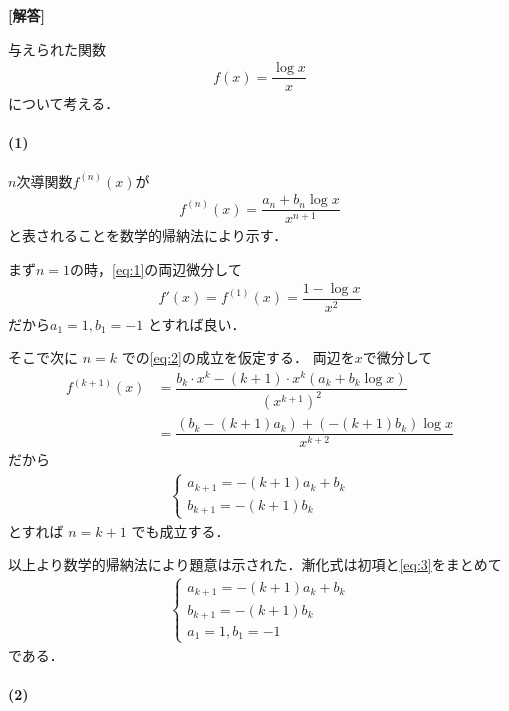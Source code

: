 \documentclass[../../main.tex]{subfiles}
\begin{document}
\begin{oframed}
  
\end{oframed}

{\bf [解答]}

与えられた関数
\begin{align}
  f(x) = \dfrac{\log x}{x} \label{eq:1}
\end{align}
について考える．

\paragraph{(1)}

$n$次導関数$f^{(n)}(x)$が
\begin{align}
  f^{(n)}(x) = \dfrac{a_n + b_n \log x}{x^{n+1}} \label{eq:2}
\end{align}
と表されることを数学的帰納法により示す．

まず$n=1$の時，\cref{eq:1}の両辺微分して
\begin{align}
  f'(x) = f^{(1)}(x) = \dfrac{1 - \log x}{x^2}
\end{align}
だから$a_1 = 1, b_1 = -1$ とすれば良い．

そこで次に $n=k$ での\cref{eq:2}の成立を仮定する．
両辺を$x$で微分して
\begin{align}
  f^{(k+1)}(x)
  &= \dfrac{b_k \cdot x^k - (k+1) \cdot x^k (a_k + b_k \log x)}{(x^{k+1})^2} \\
  &= \dfrac{(b_k - (k+1) a_k) + (-(k+1) b_k) \log x}{x^{k+2}}
\end{align}
だから
\begin{align}
  \begin{cases}
    a_{k+1} = -(k+1) a_k + b_k \\
    b_{k+1} = -(k+1) b_k
  \end{cases} \label{eq:3}
\end{align}
とすれば $n=k+1$ でも成立する．

以上より数学的帰納法により題意は示された．漸化式は初項と\cref{eq:3}をまとめて
\begin{align}
  \begin{cases}
    a_{k+1} = -(k+1) a_k + b_k \\
    b_{k+1} = -(k+1) b_k \\
    a_1 = 1, b_1 = -1
  \end{cases} \label{eq:4}
\end{align}
である．

\paragraph{(2)}
\end{document}
